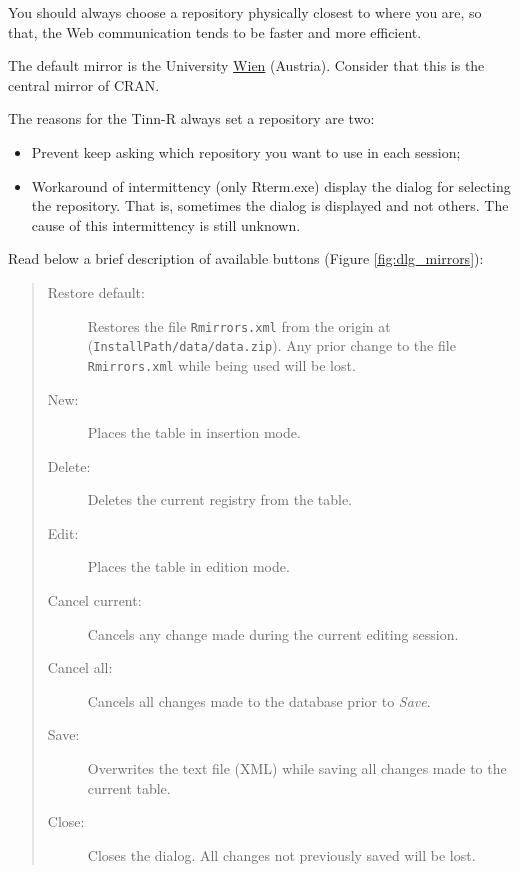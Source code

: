 You should always choose a repository physically closest to where you are,
so that, the Web communication tends to be faster and more efficient.

The default mirror is the University \href{http://cran.at.r-project.org/}{Wien}
(Austria). Consider that this is the central mirror of CRAN.

The reasons for the Tinn-R always set a repository are two:
\begin {itemize}
   \item Prevent \RR{} keep asking which repository you want to use in each session;
   \item Workaround of intermittency (only Rterm.exe) display the dialog for selecting the repository.
    That is, sometimes the dialog is displayed and not others.
    The cause of this intermittency is still unknown.
\end {itemize}

Read below a brief description of available buttons (Figure \ref{fig:dlg_mirrors}):

\begin{quote}
  \begin{footnotesize}
    \begin{description}
      \item[Restore default:]
        Restores the file \texttt{Rmirrors.xml} from the origin at
        (\texttt{InstallPath/data/data.zip}). Any prior change to the
        file \texttt{Rmirrors.xml} while being used will be lost.
      \item[New:]
        Places the table in insertion mode.
      \item[Delete:]
        Deletes the current registry from the table.
      \item[Edit:]
        Places the table in edition mode.
      \item[Cancel current:]
        Cancels any change made during the current editing session.
      \item[Cancel all:]
        Cancels all changes made to the database prior to \textit{Save}.
      \item[Save:]
        Overwrites the text file (XML) while saving all changes made to the current table.
      \item[Close:]
        Closes the dialog. All changes not previously saved will be lost.
    \end{description}
  \end{footnotesize}
\end{quote}